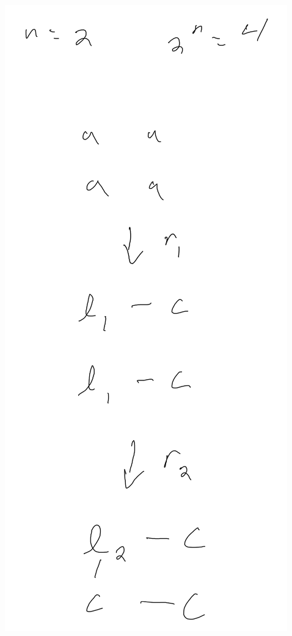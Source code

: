 \documentclass[]{article}
\numberwithin{equation}{section}
\begin{document}
\begin{multicols}{3}
    \includegraphics[width=\columnwidth]{figs/pblm6_2.png}

\end{multicols}
\end{document}
